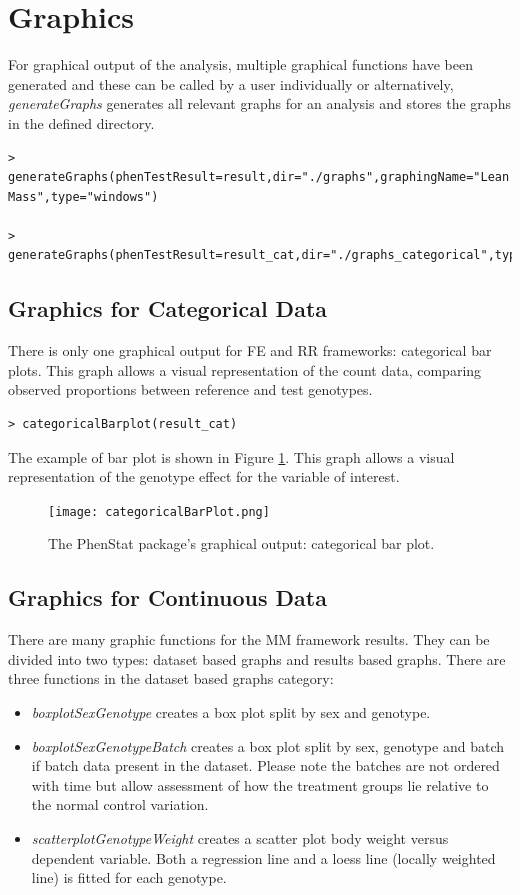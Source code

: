 \documentclass[12pt,a4paper]{article}
\begin{document}
\section{Graphics}
For graphical output of the analysis, multiple graphical functions have been generated and these can be called by a user individually or alternatively, 
\textit{generateGraphs} generates all relevant graphs for an analysis and stores the graphs in the defined directory. 

\begingroup
    \fontsize{8pt}{12pt}\selectfont
\begin{verbatim}
> generateGraphs(phenTestResult=result,dir="./graphs",graphingName="Lean Mass",type="windows")

> generateGraphs(phenTestResult=result_cat,dir="./graphs_categorical",type="windows")
\end{verbatim}
\endgroup 

\subsection{Graphics for Categorical Data}
There is only one graphical output for FE and RR frameworks: categorical bar plots. This graph allows a visual representation of the count data, comparing observed proportions between reference and test genotypes.  

\begingroup
    \fontsize{8pt}{12pt}\selectfont
\begin{verbatim}
> categoricalBarplot(result_cat)
\end{verbatim}
\endgroup 

The example of bar plot is shown in Figure \ref{fig:06}. This graph allows a visual representation of the genotype effect for the variable of interest.
\begin{figure}[!htpb]%
\centerline{\texttt{[image: categoricalBarPlot.png]}}
\caption{The PhenStat package's graphical output: categorical bar plot.}\label{fig:06}
\end{figure}

\subsection{Graphics for Continuous Data}
There are many graphic functions for the MM framework results. They can be divided into two types: dataset based graphs and results based graphs.
There are three functions in the dataset based graphs category:
\begin{itemize}
\item \textit{boxplotSexGenotype} creates a box plot split by sex and genotype.
\item \textit{boxplotSexGenotypeBatch} creates a box plot split by sex, genotype and batch if batch data present in the dataset. Please note the batches are not ordered with time but allow assessment of how the treatment groups lie relative to the normal control variation.
\item \textit{scatterplotGenotypeWeight} creates a scatter plot body weight versus dependent variable. Both a regression line and a loess line (locally weighted line) is fitted for each genotype.
\end{itemize}
\end{document}

